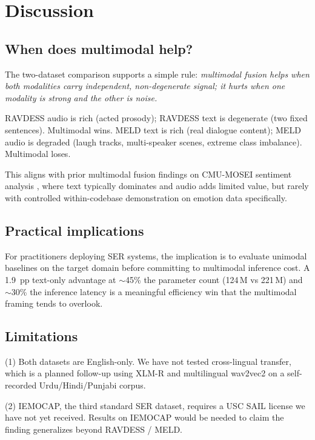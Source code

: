 \documentclass[a4paper,10pt]{article}
\begin{document}
\section{Discussion}

\subsection{When does multimodal help?}

The two-dataset comparison supports a simple rule: \emph{multimodal fusion
helps when both modalities carry independent, non-degenerate signal; it
hurts when one modality is strong and the other is noise.}

RAVDESS audio is rich (acted prosody); RAVDESS text is degenerate (two
fixed sentences). Multimodal wins. MELD text is rich (real dialogue
content); MELD audio is degraded (laugh tracks, multi-speaker scenes,
extreme class imbalance). Multimodal loses.

This aligns with prior multimodal fusion findings on CMU-MOSEI sentiment
analysis \cite{zadeh2018,hazarika2020}, where text typically dominates and
audio adds limited value, but rarely with controlled within-codebase
demonstration on emotion data specifically.

\subsection{Practical implications}

For practitioners deploying SER systems, the implication is to evaluate
unimodal baselines on the target domain before committing to multimodal
inference cost. A 1.9~pp text-only advantage at $\sim$45\% the parameter
count (124\,M vs 221\,M) and $\sim$30\% the inference latency is a
meaningful efficiency win that the multimodal framing tends to overlook.

\subsection{Limitations}

(1) Both datasets are English-only. We have not tested cross-lingual
transfer, which is a planned follow-up using XLM-R and multilingual
wav2vec2 on a self-recorded Urdu/Hindi/Punjabi corpus.

(2) IEMOCAP, the third standard SER dataset, requires a USC SAIL license
we have not yet received. Results on IEMOCAP would be needed to claim the
finding generalizes beyond RAVDESS / MELD.
\end{document}
